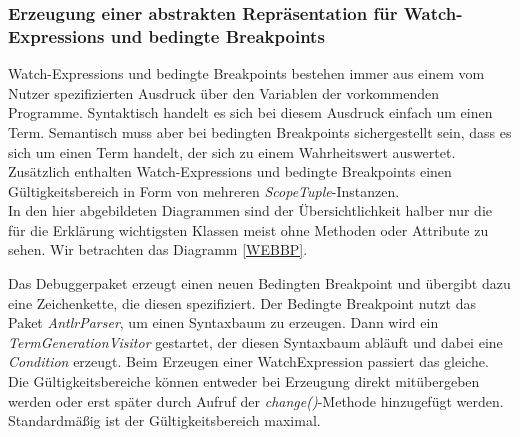 \documentclass[parskip=full]{scrartcl}
\begin{document}
\subsubsection{Erzeugung einer abstrakten Repräsentation für Watch-Expressions und bedingte Breakpoints}
Watch-Expressions und bedingte Breakpoints bestehen immer aus einem vom Nutzer spezifizierten Ausdruck über den Variablen der vorkommenden Programme. Syntaktisch handelt es sich bei diesem Ausdruck einfach um einen Term. Semantisch muss aber bei bedingten Breakpoints sichergestellt sein, dass es sich um einen Term handelt, der sich zu einem Wahrheitswert auswertet. 
Zusätzlich enthalten Watch-Expressions und bedingte Breakpoints einen Gültigkeitsbereich in Form von mehreren \textit{ScopeTuple}-Instanzen. 
\\
In den hier abgebildeten Diagrammen sind der Übersichtlichkeit halber nur die für die Erklärung wichtigsten Klassen meist ohne Methoden oder Attribute zu sehen.
Wir betrachten das Diagramm \ref{WEBBP}.  
\begin{center}
\label{WEBBP}
\end{center}
Das Debuggerpaket erzeugt einen neuen Bedingten Breakpoint und übergibt dazu eine Zeichenkette, die diesen spezifiziert. Der Bedingte Breakpoint nutzt das Paket \textit{AntlrParser}, um einen Syntaxbaum zu erzeugen. Dann wird ein \textit{TermGenerationVisitor} gestartet, der diesen Syntaxbaum abläuft und dabei eine \textit{Condition} erzeugt. Beim Erzeugen einer WatchExpression passiert das gleiche. Die Gültigkeitsbereiche können entweder bei Erzeugung direkt mitübergeben werden oder erst später durch Aufruf der \textit{change()}-Methode hinzugefügt werden. Standardmäßig ist der Gültigkeitsbereich maximal.
\newpage
\end{document}
